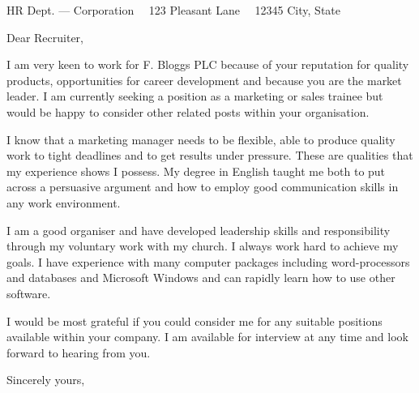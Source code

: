 \documentclass{scrlttr2}
\renewcommand{\\}{\ {\large\textperiodcentered}\ }
\begin{document}

\begin{letter}{ %
HR Dept. --- Corporation\\
123 Pleasant Lane\\
12345 City, State
}


\opening{Dear Recruiter,}

I am very keen to work for F. Bloggs PLC because of your reputation for quality products, opportunities for career development and because you are the market leader. I am currently seeking a position as a marketing or sales trainee but would be happy to consider other related posts within your organisation.\\

I know that a marketing manager needs to be flexible, able to produce quality work to tight deadlines and to get results under pressure. These are qualities that my experience shows I possess. My degree in English taught me both to put across a persuasive argument and how to employ good communication skills in any work environment.\\

I am a good organiser and have developed leadership skills and responsibility through my voluntary work with my church. I always work hard to achieve my goals. I have experience with many computer packages including word-processors and databases and Microsoft Windows and can rapidly learn how to use other software.\\

I would be most grateful if you could consider me for any suitable positions available within your company. I am available for interview at any time and look forward to hearing from you.\\

Sincerely yours, \\ \\ \\


\end{letter}
\end{document}
